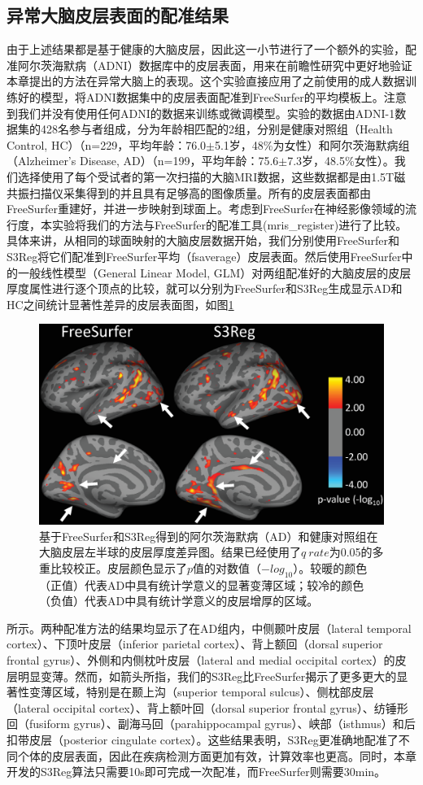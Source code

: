 \subsection{异常大脑皮层表面的配准结果}
由于上述结果都是基于健康的大脑皮层，因此这一小节进行了一个额外的实验，配准阿尔茨海默病（ADNI）数据库\cite{jack2008alzheimer}中的皮层表面，用来在前瞻性研究中更好地验证本章提出的方法在异常大脑上的表现。这个实验直接应用了之前使用的成人数据训练好的模型，将ADNI数据集中的皮层表面配准到FreeSurfer的平均模板上。注意到我们并没有使用任何ADNI的数据来训练或微调模型。实验的数据由ADNI-1数据集的428名参与者组成，分为年龄相匹配的2组，分别是健康对照组（Health Control, HC）（n=229，平均年龄：76.0$\pm$5.1岁，48\%为女性）和阿尔茨海默病组（Alzheimer's Disease, AD）（n=199，平均年龄：75.6$\pm$7.3岁，48.5\%女性）。我们选择使用了每个受试者的第一次扫描的大脑MRI数据，这些数据都是由1.5T磁共振扫描仪采集得到的并且具有足够高的图像质量。所有的皮层表面都由FreeSurfer重建好\cite{fischl2012freesurfer}，并进一步映射到球面上。考虑到FreeSurfer在神经影像领域的流行度，本实验将我们的方法与FreeSurfer的配准工具(mris\_register)进行了比较。具体来讲，从相同的球面映射的大脑皮层数据开始，我们分别使用FreeSurfer和S3Reg将它们配准到FreeSurfer平均（fsaverage）皮层表面\cite{fischl2012freesurfer}。然后使用FreeSurfer中的一般线性模型（General Linear Model, GLM）对两组配准好的大脑皮层的皮层厚度属性进行逐个顶点的比较，就可以分别为FreeSurfer和S3Reg生成显示AD和HC之间统计显著性差异的皮层表面图，如图\ref{fig:ADVSHC}
\begin{figure}[h]
	\centering
	\includegraphics[width=0.8\linewidth]{figure/ADVSHC.eps}
	\caption{基于FreeSurfer和S3Reg得到的阿尔茨海默病（AD）和健康对照组在大脑皮层左半球的皮层厚度差异图。结果已经使用了$q~rate$为0.05的多重比较校正。皮层颜色显示了$p$值的对数值（$-log_{10}$）。较暖的颜色（正值）代表AD中具有统计学意义的显著变薄区域；较冷的颜色（负值）代表AD中具有统计学意义的皮层增厚的区域。}
	\label{fig:ADVSHC}
\end{figure}
所示。两种配准方法的结果均显示了在AD组内，中侧颞叶皮层（lateral temporal cortex）、下顶叶皮层（inferior parietal cortex）、背上额回（dorsal superior frontal gyrus）、外侧和内侧枕叶皮层（lateral and medial occipital cortex）的皮层明显变薄。然而，如箭头所指，我们的S3Reg比FreeSurfer揭示了更多更大的显著性变薄区域，特别是在颞上沟（superior temporal sulcus）、侧枕部皮层（lateral occipital cortex）、背上额叶回（dorsal superior frontal gyrus）、纺锤形回（fusiform gyrus）、副海马回（parahippocampal gyrus）、峡部（isthmus）和后扣带皮层（posterior cingulate cortex）。这些结果表明，S3Reg更准确地配准了不同个体的皮层表面，因此在疾病检测方面更加有效，计算效率也更高。同时，本章开发的S3Reg算法只需要10s即可完成一次配准，而FreeSurfer则需要30min。

